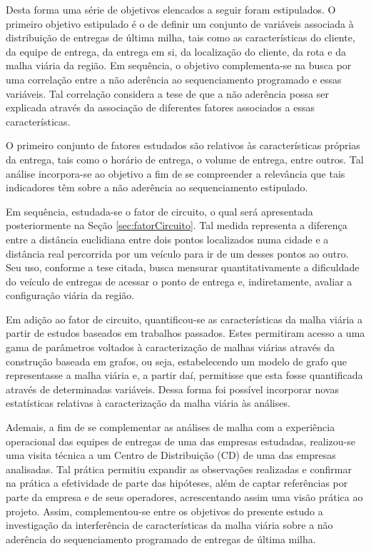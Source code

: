 Desta forma uma série de objetivos elencados a seguir foram estipulados.
O primeiro objetivo estipulado é o de definir um conjunto de variáveis associada à distribuição de entregas de última milha, tais como as características do cliente, da equipe de entrega, da entrega em si, da localização do cliente, da rota e da malha viária da região.
Em sequência, o objetivo complementa-se na busca por uma correlação entre a não aderência ao sequenciamento programado e essas variáveis. Tal correlação considera a tese de que a não aderência possa ser explicada através da associação de diferentes fatores associados a essas características.

O primeiro conjunto de fatores estudados são relativos às características próprias da entrega, tais como o horário de entrega, o volume de entrega, entre outros. Tal análise incorpora-se ao objetivo a fim de se compreender a relevância que tais indicadores têm sobre a não aderência ao sequenciamento estipulado.

Em sequência, estudada-se o fator de circuito, o qual será apresentada posteriormente na Seção \ref{sec:fatorCircuito}. 
Tal medida representa a diferença entre a distância euclidiana entre dois pontos localizados numa cidade e a distância real percorrida por um veículo para ir de um desses pontos ao outro. Seu uso, conforme a tese citada, busca mensurar quantitativamente a dificuldade do veículo de entregas de acessar o ponto de entrega e, indiretamente, avaliar a configuração viária da região.

Em adição ao fator de circuito, quantificou-se as características da malha viária a partir de estudos baseados em trabalhos passados.
Estes permitiram acesso a uma gama de parâmetros voltados à caracterização de malhas viárias através da construção baseada em grafos, ou seja, estabelecendo um modelo de grafo que representasse a malha viária e, a partir daí, permitisse que esta fosse quantificada através de determinadas variáveis.
Dessa forma foi possível incorporar novas estatísticas relativas à caracterização da malha viária às análises.

Ademais, a fim de se complementar as análises de malha com a experiência operacional das equipes de entregas de uma das empresas estudadas, realizou-se uma visita técnica a um Centro de Distribuição (CD) de uma das empresas analisadas.
Tal prática permitiu expandir as observações realizadas e confirmar na prática a efetividade de parte das hipóteses, além de captar referências por parte da empresa e de seus operadores, acrescentando assim uma visão prática ao projeto.
%
Assim, complementou-se entre os objetivos do presente estudo  a investigação da interferência de características da malha viária sobre a não aderência do sequenciamento programado de entregas de última milha.

